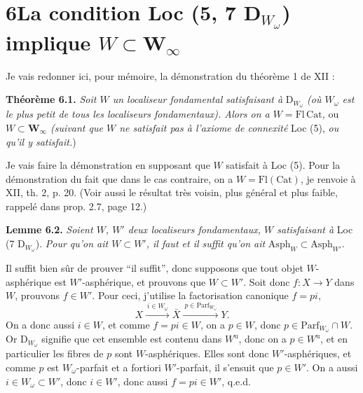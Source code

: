\documentclass[11pt]{article}
\newcommand{\printedpage}[1]{\marginpar{\footnotesize p.~#1}}
\newcommand{\msp}[1]{\marginpar{\footnotesize [#1]}}
\begin{document}
\section*{6\quad La condition Loc (5, 7 D$_{W_\omega}$) implique $W \subset \mathbf{W}_\infty$}

Je vais redonner ici, pour mémoire, la démonstration du théorème 1 de XII :

\textbf{Théorème 6.1.} \textit{Soit $W$ un localiseur fondamental satisfaisant à} D$_{W_\omega}$ \textit{(où $W_\omega$ est le plus petit de tous les localiseurs fondamentaux). Alors on a $W = \mathrm{Fl}\,\mathrm{Cat}$,} ou \textit{$W \subset \mathbf{W}_\infty$ (suivant que $W$ ne satisfait pas à l'axiome de connexité} Loc (5), \textit{ou qu'il y satisfait.})

Je vais faire la démonstration en supposant que $W$ satisfait à Loc (5). Pour la démonstration du fait que dans le cas contraire, on a $W = \mathrm{Fl}(\mathrm{Cat})$, je renvoie à XII, th. 2, p. 20. (Voir aussi le résultat très voisin, plus général et plus faible, rappelé dans prop. 2.7, page 12.)

\textbf{Lemme 6.2.} \textit{Soient $W$, $W'$ deux localiseurs fondamentaux, $W$ satisfaisant à} Loc (7 D$_{W_\omega}$). \textit{Pour qu'on ait $W \subset W'$, il faut et il suffit qu'on ait} $\mathrm{Asph}_W \subset \mathrm{Asph}_{W'}$.

\msp{page 84}
Il suffit bien sûr de prouver “il suffit”, donc supposons que tout objet $W$-asphérique est $W'$-asphérique, et prouvons que $W \subset W'$. Soit donc $f : X \longrightarrow Y$ dans $W$, prouvons $f \in W'$. Pour ceci, j'utilise la factorisation canonique $f = pi$,
\[ X \xrightarrow{\ i \in W_\omega\ } \bar{X} \xrightarrow{\ p \in \mathrm{Parf}_{W_\omega}\ } Y. \]
\printedpage{45}
On a donc aussi $i \in W$, et comme $f = pi \in W$, on a $p \in W$, donc $p \in \mathrm{Parf}_{W_\omega} \cap W$. Or D$_{W_\omega}$ signifie que cet ensemble est contenu dans $W^{\mathrm{u}}$, donc on a $p \in W^{\mathrm{u}}$, et en particulier les fibres de $p$ sont $W$-asphériques. Elles sont donc $W'$-asphériques, et comme $p$ est $W_\omega$-parfait et a fortiori $W'$-parfait, il s'ensuit que $p \in W'$. On a aussi $i \in W_\omega \subset W'$, donc $i \in W'$, donc aussi $f = pi \in W'$, q.e.d.
\end{document}

